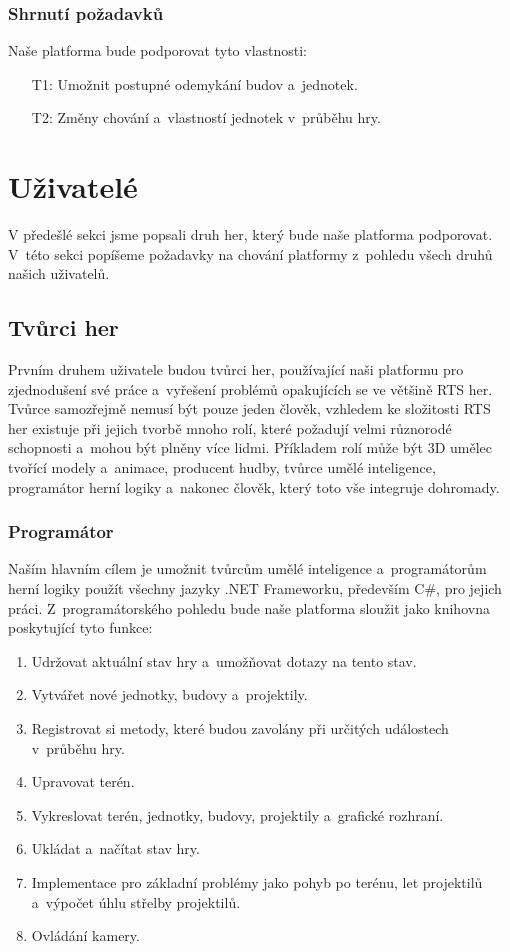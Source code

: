 \subsubsection{Shrnutí požadavků}

Naše platforma bude podporovat tyto vlastnosti:
\begin{itemize}
	\item[T1:] Umožnit postupné odemykání budov a~jednotek.
	\item[T2:] Změny chování a~vlastností jednotek v~průběhu hry.
\end{itemize}

\section{Uživatelé}
V předešlé sekci jsme popsali druh her, který bude naše platforma podporovat. V~této sekci popíšeme požadavky na chování platformy z~pohledu všech druhů našich uživatelů.

\subsection{Tvůrci her}
Prvním druhem uživatele budou tvůrci her, používající naši platformu pro zjednodušení své práce a~vyřešení problémů opakujících se ve většině RTS her. Tvůrce samozřejmě nemusí být pouze jeden člověk, vzhledem ke složitosti RTS her existuje při jejich tvorbě mnoho rolí, které požadují velmi různorodé schopnosti a~mohou být plněny více lidmi. Příkladem rolí může být 3D umělec tvořící modely a~animace, producent hudby, tvůrce umělé inteligence, programátor herní logiky a~nakonec člověk, který toto vše integruje dohromady.

\subsubsection{Programátor}
Naším hlavním cílem je umožnit tvůrcům umělé inteligence a~programátorům herní logiky použít všechny jazyky .NET Frameworku, především C\#, pro jejich práci. Z~programátorského pohledu bude naše platforma sloužit jako knihovna poskytující tyto funkce:

\begin{enumerate}
	\item Udržovat aktuální stav hry a~umožňovat dotazy na tento stav.
	\item Vytvářet nové jednotky, budovy a~projektily.
	\item Registrovat si metody, které budou zavolány při určitých událostech v~průběhu hry.
	\item Upravovat terén.
	\item Vykreslovat terén, jednotky, budovy, projektily a~grafické rozhraní.
	\item Ukládat a~načítat stav hry.
	\item Implementace pro základní problémy jako pohyb po terénu, let projektilů a~výpočet úhlu střelby projektilů.
	\item Ovládání kamery.
\end{enumerate}

